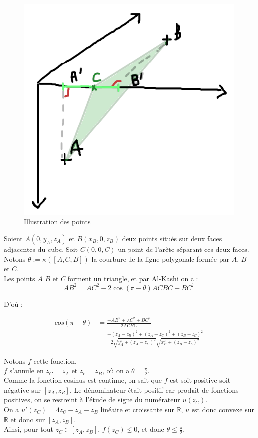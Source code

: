 \documentclass{article}
\begin{document}
\begin{figure}[!h]
    \centering
    \includegraphics[width=0.3\linewidth]{al_kashi.png}
    \caption{Illustration des points}
    \label{fig:al_kashi}
\end{figure}

Soient $A(0, y_A, z_A)$ et $B(x_B, 0, z_B)$ deux points situés sur deux faces adjacentes du cube. Soit $C(0, 0, C)$ un point de l'arête séparant ces deux faces.\\
Notons $\theta := \kappa([A, C, B])$ la courbure de la ligne polygonale formée par $A$, $B$ et $C$.\\

Les points $A$ $B$ et $C$ forment un triangle, et par Al-Kashi on a : 
$$ AB^2 = AC^2 - 2 \cos(\pi - \theta)ACBC + BC^2 $$

D'où :

\begin{align*}
    cos(\pi - \theta) &= \frac{-AB^2 + AC^2 + BC^2}{2AC BC}\\
    &= \frac{-(z_A - z_B)^2 + (z_A - z_C)^2 + (z_B- z_C)^2}{2\sqrt{y_A^2 + (z_A - z_C)^2}\sqrt{x_B^2 + (z_B - z_C)^2}}
\end{align*}

Notons $f$ cette fonction.\\
$f$ s'annule en $z_C = z_A$ et $z_c = z_B$, où on a $\theta = \frac{\pi}{2}$.\\
Comme la fonction cosinus est continue, on sait que $f$ est soit positive soit négative sur $[z_A, z_B]$. Le dénominateur était positif car produit de fonctions positives, on se restreint à l'étude de signe du numérateur $u(z_C)$.\\
On a $u'(z_C) = 4z_C - z_A - z_B$ linéaire et croissante sur $\mathbb{R}$, $u$ est donc convexe sur $\mathbb{R}$ et donc sur $[z_A, z_B]$.\\
Ainsi, pour tout $z_C \in [z_A, z_B]$, $f(z_C) \leq 0$, et donc $\theta \leq \frac{\pi}{2}$.
\end{document}

